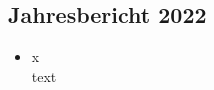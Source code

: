 \subsection{Jahresbericht 2022}
\begin{history}


    \begin{itemize}

        \item[]x\\
        text

    \end{itemize}

\end{history}
